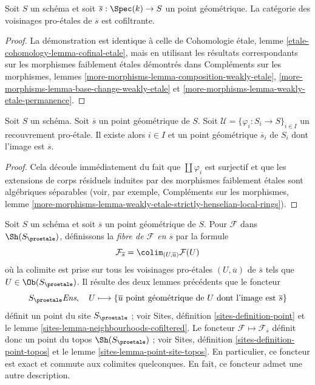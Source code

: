 \begin{lemma}
\label{lemma-cofinal-etale}
Soit $S$ un schéma et soit $\overline{s} : \Spec(k) \to S$ un
point géométrique. La catégorie des voisinages pro-\'etales de
$\overline{s}$ est cofiltrante.
\end{lemma}

\begin{proof}
La démonstration est identique à celle de
Cohomologie \'etale, lemme \ref{etale-cohomology-lemma-cofinal-etale},
mais en utilisant les résultats correspondants sur les morphismes faiblement \'etales
démontrés dans
Compléments sur les morphismes, lemmes
\ref{more-morphisms-lemma-composition-weakly-etale},
\ref{more-morphisms-lemma-base-change-weakly-etale} et
\ref{more-morphisms-lemma-weakly-etale-permanence}.
\end{proof}

\begin{lemma}
\label{lemma-geometric-lift-to-cover}
Soit $S$ un schéma. Soit $\overline{s}$ un point géométrique de $S$.
Soit $\mathcal{U} = \{\varphi_i : S_i \to S\}_{i\in I}$ un
recouvrement pro-\'etale. Il existe alors $i \in I$ et un point
géométrique $\overline{s}_i$ de $S_i$ dont l'image est $\overline{s}$.
\end{lemma}

\begin{proof}
Cela découle immédiatement du fait que $\coprod \varphi_i$ est surjectif
et que les extensions de corps résiduels induites par des morphismes faiblement \'etales
sont algébriques séparables (voir, par exemple,
Compléments sur les morphismes, lemme
\ref{more-morphisms-lemma-weakly-etale-strictly-henselian-local-rings}).
\end{proof}

\noindent
Soit $S$ un schéma et soit $\overline{s}$ un point géométrique de $S$.
Pour $\mathcal{F}$ dans $\Sh(S_\proetale)$, définissons la
{\it fibre de $\mathcal{F}$ en $\overline{s}$} par la formule
$$
\mathcal{F}_{\overline{s}} = \colim_{(U, \overline{u})} \mathcal{F}(U)
$$
où la colimite est prise sur tous les voisinages pro-\'etales $(U, \overline{u})$
de $\overline{s}$ tels que $U \in \Ob(S_\proetale)$. Il résulte des
deux lemmes précédents que le foncteur
$$
S_\proetale \textit{Ens},\quad
U \longmapsto
\{\overline{u}\text{ point géométrique de }U\text{ dont l'image est }\overline{s}\}
$$
définit un point du site $S_\proetale$ ; voir
Sites, définition \ref{sites-definition-point} et
le lemme \ref{sites-lemma-neighbourhoods-cofiltered}.
Le foncteur $\mathcal{F} \mapsto \mathcal{F}_{\overline{s}}$
définit donc un point du topos $\Sh(S_\proetale)$ ; voir
Sites, définition \ref{sites-definition-point-topos} et
le lemme \ref{sites-lemma-point-site-topos}. En particulier, ce
foncteur est exact et commute aux colimites quelconques.
En fait, ce foncteur admet une autre description.

